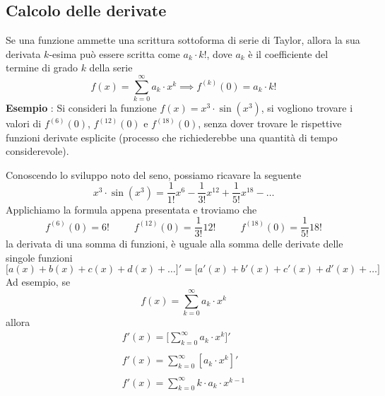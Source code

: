 \documentclass[10pt, letterpaper]{report}
\begin{document}
\subsection{Calcolo delle derivate}
Se una funzione ammette una scrittura sottoforma di serie di Taylor, allora la sua
derivata $k$-esima può essere scritta come $a_k\cdot k!$, dove $a_k$ è il coefficiente
del termine di grado $k$ della serie
$$ f(x)=\sum_{k=0}^\infty a_k\cdot x^k \implies f^{(k)}(0)=a_k\cdot k!$$
\textbf{Esempio} : Si consideri la funzione $f(x)=x^3\cdot \sin(x^3)$, si vogliono trovare i valori
di $f^{(6)}(0)$, $f^{(12)}(0)$ e $f^{(18)}(0)$, senza dover trovare le rispettive funzioni
derivate esplicite (processo che richiederebbe una quantità di tempo considerevole).
\begin{figure}[h!]
    \centering
\end{figure}\acc
Conoscendo lo sviluppo noto del seno, possiamo ricavare la seguente
$$x^3\cdot \sin(x^3)=\dfrac{1}{1!}x^6-\dfrac{1}{3!}x^{12}+\dfrac{1}{5!}x^{18}-\dots$$
Applichiamo la formula appena presentata e troviamo che
$$ f^{(6)}(0)=6!\;\;\;\;\;\;\;\;\; f^{(12)}(0)=\frac{1}{3!}12!
    \;\;\;\;\;\;\;\;\; f^{(18)}(0)=\frac{1}{5!}18!$$
 la derivata di una somma di funzioni, è uguale alla somma delle
derivate delle singole funzioni
$$ \Big[a(x)+b(x)+c(x)+d(x)+\dots\Big]'=\Big[a'(x)+b'(x)+c'(x)+d'(x)+\dots\Big]$$
Ad esempio, se $$f(x)=\sum_{k=0}^\infty a_k\cdot x^k$$
allora
$$\begin{matrix}\displaystyle f'(x)=\Big[\sum_{k=0}^\infty a_k\cdot x^k\Big]' \\ \\
        \displaystyle f'(x)=\sum_{k=0}^\infty [a_k\cdot x^k]'         \\\\
        \displaystyle f'(x)=\sum_{k=0}^\infty k\cdot a_k\cdot x^{k-1}
    \end{matrix}$$
\end{document}
